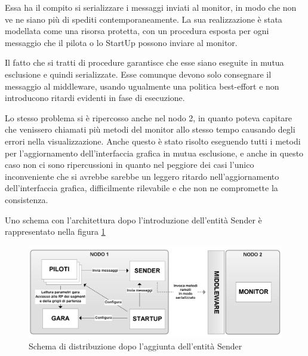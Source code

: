 \documentclass[a4paper,11pt, twoside, openright]{book}
\begin{document}
      Essa ha il compito si serializzare i messaggi inviati al monitor, in modo che non ve ne siano più di spediti
      contemporaneamente. La sua realizzazione è stata modellata come una risorsa protetta, con un procedura esposta per
      ogni messaggio che il pilota o lo StartUp possono inviare al monitor.
      
      
      
      Il fatto che si tratti di procedure garantisce che esse siano eseguite in mutua esclusione e quindi serializzate.
      Esse comunque devono solo consegnare il messaggio al middleware, usando ugualmente una politica best-effort
      e non introducono ritardi evidenti in fase di esecuzione.
      
      Lo stesso problema si è ripercosso anche nel nodo 2, in quanto poteva capitare che venissero chiamati
      più metodi del monitor allo stesso tempo causando degli errori nella visualizzazione.
      Anche questo è stato risolto eseguendo tutti i metodi per l'aggiornamento dell'interfaccia grafica in mutua esclusione,
      e anche in questo caso non ci sono ripercussioni in quanto nel peggiore dei casi l'unico inconveniente che si avrebbe sarebbe
      un leggero ritardo nell'aggiornamento dell'interfaccia grafica, difficilmente rilevabile e che non ne compromette
      la consistenza.
      
      Uno schema con l'architettura dopo l'introduzione dell'entità Sender è rappresentato nella 
      figura \ref{Fig:SchemaDistribuzioneSender}
      
      \begin{figure}[ht]
	\centering
	\includegraphics[width=120mm]{./Immagini/SchemaDistribuzioneSender.png}
	\caption{Schema di distribuzione dopo l'aggiunta dell'entità Sender}
	\label{Fig:SchemaDistribuzioneSender}
      \end{figure}      
      
\end{document}
